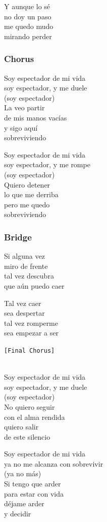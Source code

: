 Y aunque lo sé\\
no doy un paso\\
me quedo mudo\\
mirando perder

\subsubsection{Chorus}\label{chorus-39}

Soy espectador de mi vida\\
soy espectador, y me duele\\
(soy espectador)\\
La veo partir\\
de mis manos vacías\\
y sigo aquí\\
sobreviviendo

Soy espectador de mi vida\\
soy espectador, y me rompe\\
(soy espectador)\\
Quiero detener\\
lo que me derriba\\
pero me quedo\\
sobreviviendo

\subsubsection{Bridge}\label{bridge-13}

Si alguna vez\\
miro de frente\\
tal vez descubra\\
que aún puedo caer

Tal vez caer\\
sea despertar\\
tal vez romperme\\
sea empezar a ser

\texttt{{[}Final\ Chorus{]}}\strut \\
Soy espectador de mi vida\\
soy espectador, y me duele\\
(soy espectador)\\
No quiero seguir\\
con el alma rendida\\
quiero salir\\
de este silencio

Soy espectador de mi vida\\
ya no me alcanza con sobrevivir\\
(ya no más)\\
Si tengo que arder\\
para estar con vida\\
déjame arder\\
y decidir

